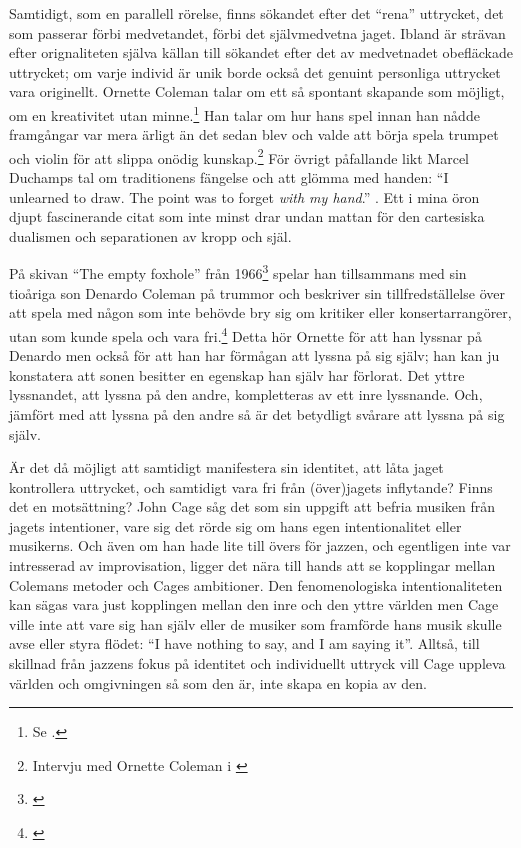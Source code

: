 \documentclass[a4paper]{article}
\begin{document}
Samtidigt, som en parallell rörelse, finns sökandet efter det ``rena'' uttrycket, det som passerar förbi medvetandet, förbi det självmedvetna jaget. Ibland är strävan efter orignaliteten själva källan till sökandet efter det av medvetnadet obefläckade uttrycket; om varje individ är unik borde också det genuint personliga uttrycket vara originellt. Ornette Coleman talar om ett så spontant skapande som möjligt, om en kreativitet utan minne.\footnote{Se \citet[s.117]{litzweiler92}.} Han talar om hur hans spel innan han nådde framgångar var mera ärligt än det sedan blev och valde att börja spela trumpet och violin för att slippa onödig kunskap.\footnote{Intervju med Ornette Coleman i \citet[s.33]{taylor77}} För övrigt påfallande likt Marcel Duchamps tal om traditionens fängelse och att glömma med handen: ``I unlearned to draw. The  point was to forget \emph{with my hand}.'' \citep[Duchamp, citerad i][s.29]{tomkins65}. Ett i mina öron djupt fascinerande citat som inte minst drar undan mattan för den cartesiska dualismen och separationen av kropp och själ.


På skivan ``The empty foxhole'' från 1966\footnote{\citet{coleman66}} spelar han tillsammans med sin tioåriga son Denardo Coleman på trummor och beskriver sin tillfredställelse över att spela med någon som inte behövde bry sig om kritiker eller konsertarrangörer, utan som kunde spela och vara fri.\footnote{\citet[Ornette Coleman citerad i][s.121]{litzweiler92}} Detta hör Ornette för att han lyssnar på Denardo men också för att han har förmågan att lyssna på sig själv; han kan ju konstatera att sonen besitter en egenskap han själv har förlorat. Det yttre lyssnandet, att lyssna på den andre, kompletteras av ett inre lyssnande. Och, jämfört med att lyssna på den andre så är det betydligt svårare att lyssna på sig själv.

Är det då möjligt att samtidigt manifestera sin identitet, att låta jaget kontrollera uttrycket, och samtidigt vara fri från (över)jagets inflytande? Finns det en motsättning? John Cage såg det som sin uppgift att befria musiken från jagets intentioner, vare sig det rörde sig om hans egen intentionalitet eller musikerns. Och även om han hade lite till övers för jazzen, och egentligen inte var intresserad av improvisation, ligger det nära till hands att se kopplingar mellan Colemans metoder och Cages ambitioner. Den fenomenologiska intentionaliteten kan sägas vara just kopplingen mellan den inre och den yttre världen men Cage ville inte att vare sig han själv eller de musiker som framförde hans musik skulle avse eller styra flödet: ``I have nothing to say, and I am saying it''. Alltså, till skillnad från jazzens fokus på identitet och individuellt uttryck vill Cage uppleva världen och omgivningen så som den är, inte skapa en kopia av den.
\end{document}
